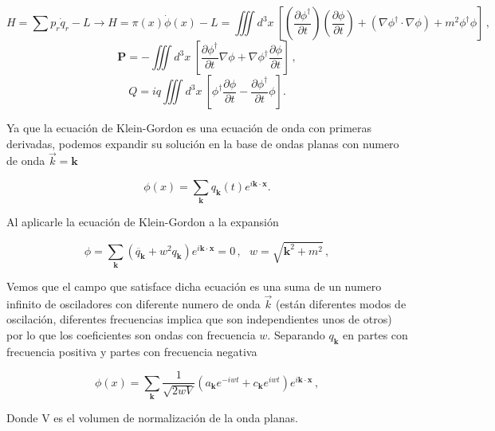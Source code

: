 \documentclass{article}
\begin{document}
\begin{equation}
  H= \sum p_r\dot{q}_r - L \rightarrow H=\pi(x) \dot{\phi} (x) - L = \iiint  d^3x \  [(\frac{\partial \phi^\dagger}{\partial t})(\frac{\partial \phi}{\partial t})+(\nabla \phi^\dagger \cdot \nabla \phi) + m^2 \phi^\dagger \phi]\,,
\end{equation}
\begin{equation}
  \mathbf{P}=-\iiint  d^3x \  [\frac{\partial \phi^\dagger}{\partial t} \nabla \phi +
  \nabla \phi^\dagger \frac{\partial \phi}{\partial t}]\,,
\end{equation}
\begin{equation}
  Q= i q \iiint  d^3x \  [ \phi^\dagger \frac{\partial \phi }{\partial t} - \frac{\partial \phi^\dagger }{\partial t}\phi].
\end{equation}

Ya que la ecuación de Klein-Gordon es una ecuación de onda con primeras derivadas, podemos expandir su solución  en la base de ondas planas con numero de onda $\overrightarrow{k}=\mathbf{k}$ 

\begin{equation}
  \phi(x) = \sum_{\mathbf{k}} q_{\mathbf{k}}(t) e^{i\mathbf{k} \cdot \mathbf{x}}.
\end{equation}

Al aplicarle la ecuación de Klein-Gordon a la expansión 

\begin{equation}
  [\partial_\mu \partial^\mu + m^2] \phi = \sum_{\mathbf{k}} (\ddot{q_{\mathbf{k}}} + w^2q_{\mathbf{k}}) e^{i\mathbf{k} \cdot \mathbf{x}} = 0\,, \ \ \ w=\sqrt{\mathbf{k}^2+m^2}\,,
\end{equation}

Vemos que el campo que satisface dicha ecuación es una suma de un numero infinito de osciladores con diferente numero de onda $\overrightarrow{k}$ (están diferentes modos de oscilación, diferentes frecuencias implica que son independientes unos de otros) por lo que los coeficientes son ondas con frecuencia $w$. Separando $q_\mathbf{k}$ en partes con frecuencia positiva y partes con frecuencia negativa

\begin{equation}
  \phi(x) = \sum_{\mathbf{k}} \frac{1}{\sqrt{2wV}} (a_{\mathbf{k}}e^{-iwt}+c_{\mathbf{k}}e^{iwt}) e^{i\mathbf{k} \cdot \mathbf{x}}\,,
\end{equation}

Donde V es el volumen de normalización de la onda planas.
\end{document}
